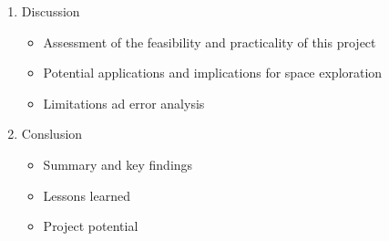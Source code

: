 \documentclass[18pt, letter]{article}
\begin{document}
\begin{enumerate}
    \item Discussion
    \begin{itemize}
        \item Assessment of the feasibility and practicality of this project
        \item Potential applications and implications for space exploration
        \item Limitations ad error analysis
    \end{itemize}

    \item Conslusion
    \begin{itemize}
        \item Summary and key findings
        \item Lessons learned
        \item Project potential
    \end{itemize}
    
\end{enumerate}
\clearpage
\end{document}
